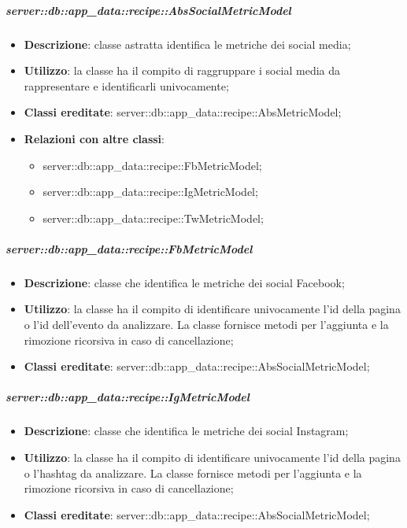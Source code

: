 		\subparagraph{server::db::app\_data::recipe::AbsSocialMetricModel} %
		\label{subp:server_db_app_data_recipe_abssocialmetricmodel}
			\begin{itemize}
				\item \textbf{Descrizione}: classe astratta identifica le metriche dei social media;
				\item \textbf{Utilizzo}: la classe ha il compito di raggruppare i social media da rappresentare e identificarli univocamente;
				\item \textbf{Classi ereditate}: server::db::app\_data::recipe::AbsMetricModel;
				\item \textbf{Relazioni con altre classi}:
					\begin{itemize}
						\item server::db::app\_data::recipe::FbMetricModel;
						\item server::db::app\_data::recipe::IgMetricModel;
						\item server::db::app\_data::recipe::TwMetricModel;
					\end{itemize}
			\end{itemize}


		\subparagraph{server::db::app\_data::recipe::FbMetricModel} %
		\label{subp:server_db_app_data_recipe_fbmetricmodel}
			\begin{itemize}
				\item \textbf{Descrizione}: classe che identifica le metriche dei social Facebook;
				\item \textbf{Utilizzo}: la classe ha il compito di identificare univocamente l'id della pagina o l'id dell'evento da analizzare. La classe fornisce metodi per l'aggiunta e la rimozione ricorsiva in caso di cancellazione;
				\item \textbf{Classi ereditate}: server::db::app\_data::recipe::AbsSocialMetricModel;
			\end{itemize}


		\subparagraph{server::db::app\_data::recipe::IgMetricModel} %
		\label{subp:server_db_app_data_recipe_igmetricmodel}
			\begin{itemize}
				\item \textbf{Descrizione}: classe che identifica le metriche dei social Instagram;
				\item \textbf{Utilizzo}: la classe ha il compito di identificare univocamente l'id della pagina o l'hashtag da analizzare. La classe fornisce metodi per l'aggiunta e la rimozione ricorsiva in caso di cancellazione;
				\item \textbf{Classi ereditate}: server::db::app\_data::recipe::AbsSocialMetricModel;
			\end{itemize}


